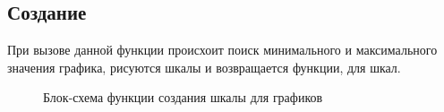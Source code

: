 \documentclass[a4paper,14pt]{extreport}
\begin{document}
\subsection{Создание}
\hspace{4ex}При вызове данной функции происхоит поиск минимального и максимального значения графика, рисуются шкалы и возвращается функции, для шкал.
\newpage
\begin{figure}[h]
\caption{Блок-схема функции создания шкалы для графиков}
\label{ris:image}
\end{figure}
\end{document}
